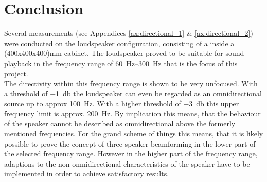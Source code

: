\section{Conclusion}
Several measurements (see Appendices \ref{ax:directional_1} \& \ref{ax:directional_2}) were conducted on the loudspeaker configuration, consisting of a \citep{seas33} inside a (400x400x400)\si{\milli\meter} cabinet. The loudspeaker proved to be suitable for sound playback in the frequency range of \SIrange{60}{300}{\hertz} that is the focus of this project.\\
The directivity within this frequency range is shown to be very unfocused. With a threshold of \SI{-1}{\decibel} the loudspeaker can even be regarded as an omnidirectional source up to approx \SI{100}{\hertz}. With a higher threshold of \SI{-3}{\decibel} this upper frequency limit is approx. \SI{200}{\hertz}. By implication this means, that the behaviour of the speaker cannot be described as omnidirectional above the formerly mentioned frequencies.
For the grand scheme of things this means, that it is likely possible to prove the concept of three-speaker-beamforming in the lower part of the selected frequency range. However in the higher part of the frequency range, adaptions to the non-omnidirectional characteristics of the speaker have to be implemented in order to achieve satisfactory results.